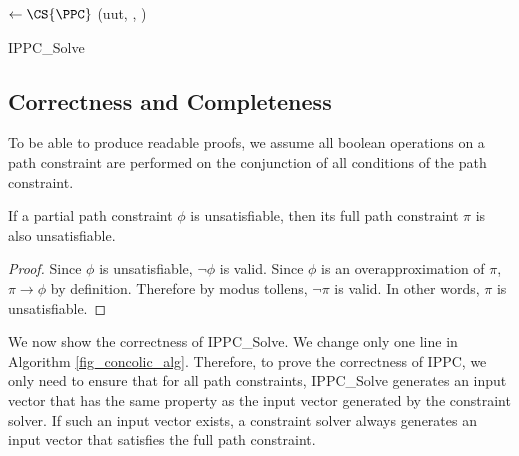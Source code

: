 \documentclass[EPiCempty]{easychair}
\begin{document}
\begin{algorithm}
\BlankLine
\TestInput$\leftarrow \CS{\PPC}$\;\label{Line2}
	\If{\TestInput $=$ \Null}
		{
			\KwReturn \Null\;
		}
		{
			\If{$!$\SAT{$\TestInput, \Pi[\I]$}}
				{
					\Append{$\PPC, \Pi[\I]$}\;
					\KwReturn \IPPC(uut, \Pi, \PPC)\;
				}
		}
\KwReturn \TestInput\;
\caption{IPPC\_Solve} \label{fig_ippc_alg}
\end{algorithm}

\subsection{Correctness and Completeness}

To be able to produce readable proofs, we assume all boolean operations on a path constraint are performed on the conjunction of all conditions of the path constraint.

\begin{theorem}
\label{thm:infeasibility}
If a partial path constraint $\phi$ is unsatisfiable, then its full path constraint $\pi$ is also unsatisfiable.
\end{theorem}

\begin{proof}
Since $\phi$ is unsatisfiable, $\neg \phi$ is valid. Since $\phi$ is an overapproximation of $\pi$, $\pi \rightarrow \phi$ by definition. Therefore by modus tollens, $\neg \pi$ is valid. In other words, $\pi$ is unsatisfiable.
\end{proof}

We now show the correctness of IPPC\_Solve. We change only one line in Algorithm \ref{fig_concolic_alg}. Therefore, to prove the correctness of IPPC, we only need to ensure that for all path constraints, IPPC\_Solve generates an input vector that has the same property as the input vector generated by the constraint solver. If such an input vector exists, a constraint solver always generates an input vector that satisfies the full path constraint.
\end{document}

